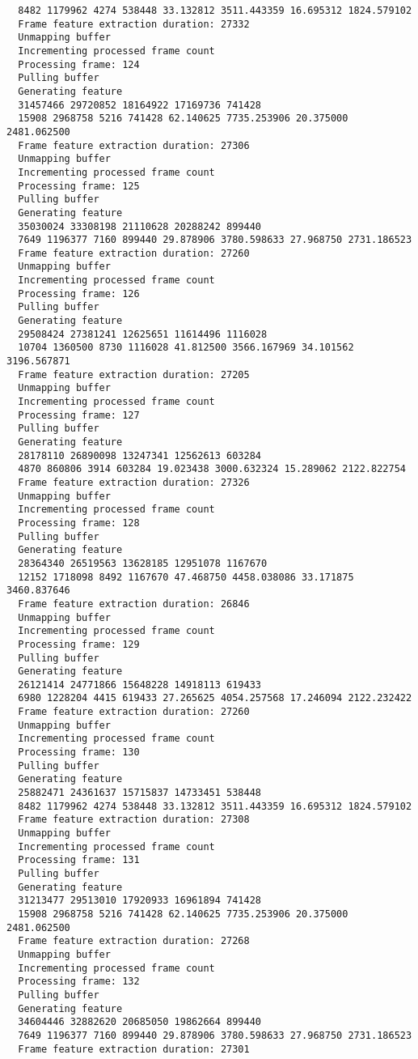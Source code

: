 \documentclass[12pt,oneside]{book}
\begin{document}
\begin{lstlisting}
  8482 1179962 4274 538448 33.132812 3511.443359 16.695312 1824.579102
  Frame feature extraction duration: 27332
  Unmapping buffer
  Incrementing processed frame count
  Processing frame: 124
  Pulling buffer
  Generating feature
  31457466 29720852 18164922 17169736 741428
  15908 2968758 5216 741428 62.140625 7735.253906 20.375000 2481.062500
  Frame feature extraction duration: 27306
  Unmapping buffer
  Incrementing processed frame count
  Processing frame: 125
  Pulling buffer
  Generating feature
  35030024 33308198 21110628 20288242 899440
  7649 1196377 7160 899440 29.878906 3780.598633 27.968750 2731.186523
  Frame feature extraction duration: 27260
  Unmapping buffer
  Incrementing processed frame count
  Processing frame: 126
  Pulling buffer
  Generating feature
  29508424 27381241 12625651 11614496 1116028
  10704 1360500 8730 1116028 41.812500 3566.167969 34.101562 3196.567871
  Frame feature extraction duration: 27205
  Unmapping buffer
  Incrementing processed frame count
  Processing frame: 127
  Pulling buffer
  Generating feature
  28178110 26890098 13247341 12562613 603284
  4870 860806 3914 603284 19.023438 3000.632324 15.289062 2122.822754
  Frame feature extraction duration: 27326
  Unmapping buffer
  Incrementing processed frame count
  Processing frame: 128
  Pulling buffer
  Generating feature
  28364340 26519563 13628185 12951078 1167670
  12152 1718098 8492 1167670 47.468750 4458.038086 33.171875 3460.837646
  Frame feature extraction duration: 26846
  Unmapping buffer
  Incrementing processed frame count
  Processing frame: 129
  Pulling buffer
  Generating feature
  26121414 24771866 15648228 14918113 619433
  6980 1228204 4415 619433 27.265625 4054.257568 17.246094 2122.232422
  Frame feature extraction duration: 27260
  Unmapping buffer
  Incrementing processed frame count
  Processing frame: 130
  Pulling buffer
  Generating feature
  25882471 24361637 15715837 14733451 538448
  8482 1179962 4274 538448 33.132812 3511.443359 16.695312 1824.579102
  Frame feature extraction duration: 27308
  Unmapping buffer
  Incrementing processed frame count
  Processing frame: 131
  Pulling buffer
  Generating feature
  31213477 29513010 17920933 16961894 741428
  15908 2968758 5216 741428 62.140625 7735.253906 20.375000 2481.062500
  Frame feature extraction duration: 27268
  Unmapping buffer
  Incrementing processed frame count
  Processing frame: 132
  Pulling buffer
  Generating feature
  34604446 32882620 20685050 19862664 899440
  7649 1196377 7160 899440 29.878906 3780.598633 27.968750 2731.186523
  Frame feature extraction duration: 27301

\end{lstlisting}
\end{document}

